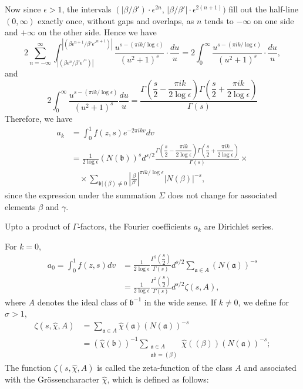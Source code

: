 Now since $\epsilon>1$, the intervals $(|\beta/\beta')\cdot
\epsilon^{2n}$, $|\beta/\beta'|\cdot\epsilon^{2(n+1)})$ fill out the
half-line $(0,\infty)$ exactly once, without gaps and overlaps, as $n$
tends to $-\infty$ on one side and $+\infty$ on the other side. Hence
we have
$$
2\sum^{\infty}_{n=-\infty}\int^{|(\beta\epsilon^{n+1}/\beta'{\epsilon'}^{n+1})|}_{|(\beta\epsilon^{n}/\beta'{\epsilon'}^{n})|}\frac{u^{s-(\pi
    ik/\log
    \epsilon)}}{(u^{2}+1)^{s}}\cdot\frac{du}{u}=2\int^{\infty}_{0}\frac{u^{s-(\pi
    ik/\log\epsilon)}}{(u^{2}+1)^{s}}\cdot \frac{du}{u}, 
$$
and
$$
2\int^{\infty}_{0}\frac{u^{s-(\pi
    ik/\log\epsilon)}}{(u^{2}+1)^{s}}\frac{du}{u}=\frac{\Gamma\left(\dfrac{s}{2}-\dfrac{\pi
    ik}{2\log \epsilon}\right)\Gamma\left(\dfrac{s}{2}+\dfrac{\pi
    ik}{2\log \epsilon}\right)}{\Gamma(s)}
$$
Therefore, we have
\begin{align*}
a_{k} &= \int^{1}_{0}f(z,s)e^{-2\pi ikv}dv\\
&=\frac{1}{2\log
  \epsilon}(N(\mathfrak{b}))^{s}d^{s/2}\frac{\Gamma\left(\dfrac{s}{2}-\dfrac{\pi
    ik}{2\log \epsilon}\right)\Gamma\left(\dfrac{s}{2}+\dfrac{\pi
    ik}{2\log \epsilon}\right)}{\Gamma(s)}\times\\
&\quad \times \sum_{\mathfrak{b}|(\beta)\neq
  0}\left|\frac{\beta}{\beta'}\right|^{\pi ik/\log \epsilon}|N(\beta)|^{-s},
\end{align*}\pageoriginale
since the expression under the summation $\Sigma$ does not change for
associated elements $\beta$ and $\gamma$.

Upto a product of $\Gamma$-factors, the Fourier coefficients $a_{k}$
are Dirichlet series.

For $k=0$,
\begin{align*}
a_{0}=\int^{1}_{0}f(z,s)dv &= \frac{1}{2\log \epsilon}
\frac{\Gamma^{2}\left(\dfrac{s}{2}\right)}{\Gamma(s)}d^{s/2}\sum_{\mathfrak{a}\in
  A}(N(\mathfrak{a}))^{-s}\\
&=
\frac{1}{2\log\epsilon}\frac{\Gamma^{2}\left(\dfrac{s}{2}\right)}{\Gamma(s)}d^{s/2}\zeta(s,A), 
\end{align*}
where $A$ denotes the ideal class of $\mathfrak{b}^{-1}$ in the wide
sense. If $k\neq 0$, we define for $\sigma>1$,
\begin{align*}
\zeta(s,\hat{\chi},A) &= \sum_{\mathfrak{a}\in
  A}\hat{\chi}(\mathfrak{a})(N(\mathfrak{a}))^{-s}\\
&= (\hat{\chi}(\mathfrak{b}))^{-1}\sum_{\substack{\mathfrak{a}\in
    A\\ \mathfrak{ab}=(\beta)}}\hat{\chi}((\beta))(N(\mathfrak{a}))^{-s}; 
\end{align*}
The function $\zeta(s,\hat{\chi},A)$ is called the zeta-function
of the class $A$ and associated with the Gr\"ossencharacter
$\hat{\chi}$, which is defined as follows:

